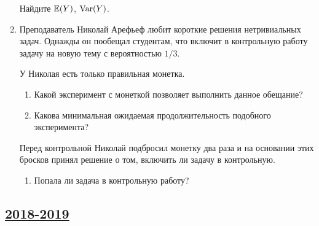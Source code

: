 \begin{enumerate}
  Найдите $\operatorname{\mathbb{E}}(Y)$, $\operatorname{Var}(Y)$.
  
  \item Преподаватель Николай Арефьеф любит короткие решения нетривиальных
  задач. 
  Однажды он пообещал студентам, что включит в контрольную
  работу задачу на новую тему с вероятностью $1/3$.
  
  У Николая есть только правильная монетка.
  
  \begin{enumerate}
  \item Какой эксперимент с монеткой позволяет выполнить данное обещание?
  \item Какова минимальная ожидаемая продолжительность подобного эксперимента?
  \end{enumerate}
  
  Перед контрольной Николай подбросил монетку два раза и на основании этих
  бросков принял решение о том, включить ли задачу в контрольную.
  
  \begin{enumerate}[resume]
    \item Попала ли задача в контрольную работу?
  \end{enumerate}
  
  
  \end{enumerate}
  



\subsection[2018-2019]{\hyperref[sec:sol_kr_01_ip_2018_2019]{2018-2019}}
\label{sec:kr_01_ip_2018_2019}

